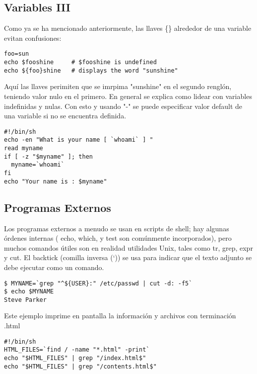\documentclass{article}
\begin{document}
\begin{itemize}
\subsection*{Variables III}
Como ya se ha mencionado anteriormente, las llaves \{\} alrededor de una variable evitan confusiones:
\begin{verbatim}
foo=sun
echo $fooshine     # $fooshine is undefined
echo ${foo}shine   # displays the word "sunshine"
\end{verbatim}
Aquí las llaves perimiten que se imrpima "sunshine" en el segundo renglón, teniendo valor nulo en el primero. En general se explica como lidear con variables indefinidas y nulas. Con esto y usando "-" se puede especificar valor default de una variable si no se encuentra definida.
\begin{verbatim}
#!/bin/sh
echo -en "What is your name [ `whoami` ] "
read myname
if [ -z "$myname" ]; then
  myname=`whoami`
fi
echo "Your name is : $myname"
\end{verbatim}
\subsection*{Programas Externos}
Los programas externos a menudo se usan en scripts de shell; hay algunas órdenes internas ( echo, which, y test son comúnmente incorporados), pero muchos comandos útiles son en realidad utilidades Unix, tales como tr, grep, expr y cut. El backtick (comilla inversa (`)) se usa para indicar que el texto adjunto se debe ejecutar como un comando.
\begin{verbatim}
$ MYNAME=`grep "^${USER}:" /etc/passwd | cut -d: -f5`
$ echo $MYNAME
Steve Parker
\end{verbatim}
Este ejemplo imprime en pantalla la información y archivos con terminación .html
\begin{verbatim}
#!/bin/sh
HTML_FILES=`find / -name "*.html" -print`
echo "$HTML_FILES" | grep "/index.html$"
echo "$HTML_FILES" | grep "/contents.html$"
\end{verbatim}

\end{itemize}
\end{document}

